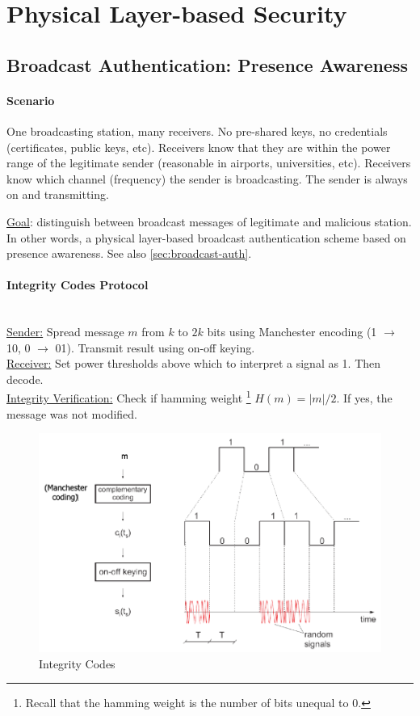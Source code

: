 \section{Physical Layer-based Security}

\subsection{Broadcast Authentication: Presence Awareness}

\paragraph{Scenario}
One broadcasting station, many receivers.
No pre-shared keys, no credentials (certificates, public keys, etc).
Receivers know that they are within the power range of the legitimate sender
(reasonable in airports, universities, etc).
Receivers know which channel (frequency) the sender is broadcasting.
The sender is always on and transmitting.

\underline{Goal}: distinguish between broadcast messages of legitimate and malicious station.
In other words, a physical layer-based broadcast authentication scheme based on presence awareness.
See also \autoref{sec:broadcast-auth}.

\paragraph{Integrity Codes Protocol} \mbox{}\\
\underline{Sender:}
Spread message $m$ from $k$ to $2k$ bits using Manchester encoding (1 $\rightarrow$ 10, 0 $\rightarrow$ 01).
Transmit result using on-off keying.
\\
\underline{Receiver:}
Set power thresholds above which to interpret a signal as 1. Then decode.
\\
\underline{Integrity Verification:}
Check if hamming weight%
\footnote{Recall that the hamming weight is the number of bits unequal to 0.}
$H(m)=|m|/2$. If yes, the message was not modified.

\begin{figure}[h]
	\centering
	\includegraphics[scale=0.4]{images/7-integrity-code.png}
	\caption{Integrity Codes}%
	\label{fig:integrity-code}
\end{figure}

